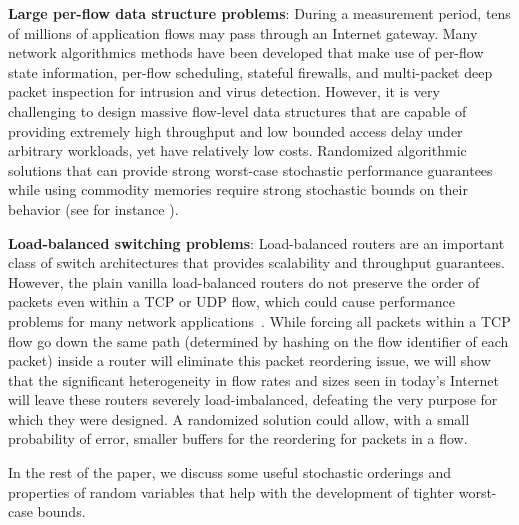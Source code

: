 \medskip
\noindent
\textbf{Large per-flow data structure problems}:
During a measurement period, tens of millions of application flows may pass through an Internet gateway. Many network algorithmics methods have been developed that make use of per-flow state information, \eg per-flow scheduling, stateful firewalls, and multi-packet deep packet inspection for intrusion and virus detection. However, it is very challenging to design massive flow-level data structures that are capable of providing extremely high throughput and low bounded access delay under arbitrary workloads, yet have relatively low costs. Randomized 
algorithmic solutions that can provide strong worst-case stochastic performance guarantees while using commodity memories
require strong stochastic bounds on their behavior (see for instance \cite{Hua08BRICK,Zhao09DRAM}).

\medskip
\noindent
\textbf{Load-balanced switching problems}:
Load-balanced routers are an important class of switch architectures that
provides scalability and throughput guarantees.  However, the plain vanilla 
load-balanced routers do not preserve the order of packets even within a TCP or UDP flow,
which could cause performance problems for many network applications~\cite{Chang02BvN1,Chang02BvN2}.
While forcing all packets within a TCP flow go down the same path (\eg determined by hashing on the flow identifier of each packet)
inside a router will eliminate this packet reordering issue, we will show that the significant heterogeneity in flow rates and sizes
seen in today's Internet will leave 
these routers severely load-imbalanced, defeating the very purpose for which they were designed. A randomized solution could allow, with
a small probability of error, smaller buffers for the reordering for packets in a flow.


In the rest of the paper, we
discuss some useful stochastic orderings and properties of random variables that help with the development
of tighter worst-case bounds. 

